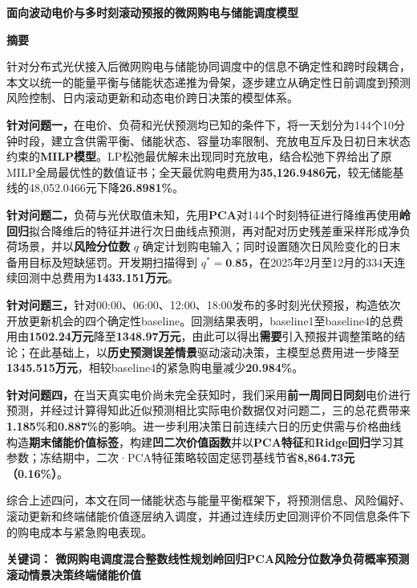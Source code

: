 
\begin{center}
  {\bfseries 面向波动电价与多时刻滚动预报的微网购电与储能调度模型}
\end{center}

\vspace{1em}
\begin{center}
  {\bfseries 摘\quad 要}
\end{center}

\noindent
针对分布式光伏接入后微网购电与储能协同调度中的信息不确定性和跨时段耦合，本文以统一的能量平衡与储能状态递推为骨架，逐步建立从确定性日前调度到预测风险控制、日内滚动更新和动态电价跨日决策的模型体系。

\textbf{针对问题一，}在电价、负荷和光伏预测均已知的条件下，将一天划分为144个10分钟时段，建立含供需平衡、储能状态、容量功率限制、充放电互斥及日初日末状态约束的\textbf{MILP模型}。LP松弛最优解未出现同时充放电，结合松弛下界给出了原MILP全局最优性的数值证书；全天最优购电费用为\textbf{35{,}126.9486元}，较无储能基线的48{,}052.0466元下降\textbf{26.8981\%}。

\textbf{针对问题二，}负荷与光伏取值未知，先用\textbf{PCA}对144个时刻特征进行降维再使用\textbf{岭回归}拟合降维后的特征并进行次日曲线点预测，再对配对历史残差重采样形成净负荷场景，并以\textbf{风险分位数} $q$ 确定计划购电输入；同时设置随次日风险变化的日末备用目标及短缺惩罚。开发期扫描得到 $q^\ast=\textbf{0.85}$，在2025年2月至12月的334天连续回测中总费用为\textbf{1433.151万元}。

\textbf{针对问题三，}针对00:00、06:00、12:00、18:00发布的多时刻光伏预报，构造依次开放更新机会的四个确定性baseline。回测结果表明，baseline1至baseline4的总费用由\textbf{1502.24万元}降至\textbf{1348.97万元}，由此可以得出\textbf{需要}引入预报并调整策略的结论；在此基础上，以\textbf{历史预测误差情景}驱动滚动决策，主模型总费用进一步降至\textbf{1345.515万元}，相较baseline4的紧急购电量减少\textbf{20.984\%}。

\textbf{针对问题四，}在当天真实电价尚未完全获知时，我们采用\textbf{前一周同日同刻}电价进行预测，并经过计算得知此近似预测相比实际电价数据仅对问题二，三的总花费带来\textbf{1.185\%}和\textbf{0.887\%}的影响。进一步利用决策日前连续六日的历史供需与价格曲线构造\textbf{期末储能价值标签}，构建\textbf{凹二次价值函数}并以\textbf{PCA特征}和\textbf{Ridge回归}学习其参数；冻结期中，二次·PCA特征策略较固定惩罚基线节省\textbf{8{,}864.73元（0.16\%）}。

综合上述四问，本文在同一储能状态与能量平衡框架下，将预测信息、风险偏好、滚动更新和终端储能价值逐层纳入调度，并通过连续历史回测评价不同信息条件下的购电成本与紧急购电表现。

\vspace{0.6em}
\noindent\textbf{关键词： 微网购电调度\quad 混合整数线性规划\quad 岭回归\quad PCA\quad 风险分位数\quad 净负荷概率预测\quad 滚动情景决策\quad 终端储能价值}

\newpage
